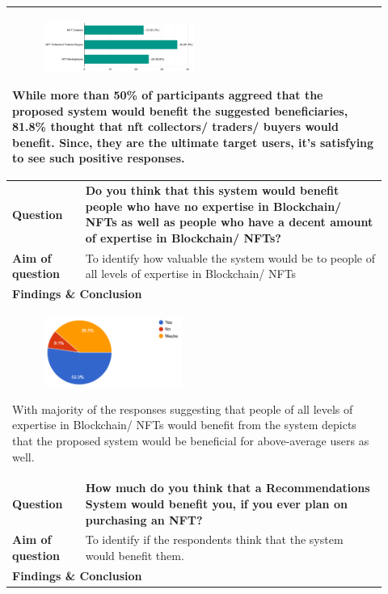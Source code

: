\begin{longtable}{|p{0.18\linewidth}|p{0.74\linewidth}|}
\multicolumn{2}{|l|}{
\parbox{\textwidth}{
\begin{figure}
\includegraphics[width=0.5\textwidth]{images/SRS/survey/survey-2.png}
\end{figure}

While more than 50\% of participants aggreed that the proposed system would benefit the suggested beneficiaries, 81.8\% thought that \gls{nft} collectors/ traders/ buyers would benefit. Since, they are the ultimate target users, it's satisfying to see such positive responses.
}
}
\\
\hline
\textbf{Question} & \textbf{Do you think that this system would benefit people who have no expertise in Blockchain/ NFTs as well as people who have a decent amount of expertise in Blockchain/ NFTs?} \\
\hline
\textbf{Aim of question} & To identify how valuable the system would be to people of all levels of expertise in Blockchain/ NFTs \\
\hline
\multicolumn{2}{|l|}{\textbf{Findings \& Conclusion}} \\

\multicolumn{2}{|l|}{
\parbox{\textwidth}{
\begin{figure}
\includegraphics[width=0.46\textwidth]{images/SRS/survey/survey-3.png}
\end{figure}

With majority of the responses suggesting that people of all levels of expertise in Blockchain/ NFTs would benefit from the system depicts that the proposed system would be beneficial for above-average users as well.

}
}
\\
\hline
\textbf{Question} & \textbf{How much do you think that a Recommendations System would benefit you, if you ever plan on purchasing an NFT?} \\
\hline
\textbf{Aim of question} & To identify if the respondents think that the system would benefit them. \\
\hline
\multicolumn{2}{|l|}{\textbf{Findings \& Conclusion}} \\


\end{longtable}
